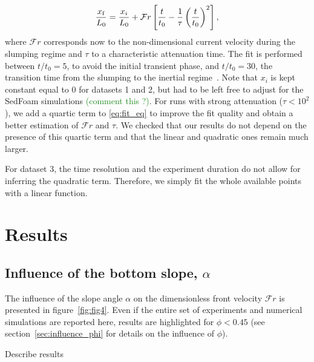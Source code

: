 \documentclass[twocolumn]{article}
\newcommand*{\cyril}{\textcolor{ForestGreen}}
\begin{document}
\begin{equation}
	\label{eq:fit_eq}
	\frac{x_{\rm f}}{L_{0}} = \frac{x_{i}}{L_0} + \mathcal{F}r \left[\frac{t}{t_{0}} - \frac{1}{\tau} \left(\frac{t}{t_{0}}\right)^{2}\right],
\end{equation}
where $\mathcal{F}r$ corresponds now to the non-dimensional current velocity during the slumping regime and $\tau$ to a characteristic attenuation time. The fit is performed between $t/t_{0} = 5$, to avoid the initial transient phase, and $t/t_{0} = 30$, the transition time from the slumping to the inertial regime~\citep{refs}. Note that $x_{i}$ is kept constant equal to 0 for datasets 1 and 2, but had to be left free to adjust for the SedFoam simulations \cyril{(comment this ?)}. For runs with strong attenuation ($\tau < 10^{2}$), we add a quartic term to \eqref{eq:fit_eq} to improve the fit quality and obtain a better estimation of $\mathcal{F}r$ and $\tau$. We checked that our results do not depend on the presence of this quartic term and that the linear and quadratic ones remain much larger.

For dataset 3, the time resolution and the experiment duration do not allow for inferring the quadratic term. Therefore, we simply fit the whole available points with a linear function.

\section{Results}

\subsection{Influence of the bottom slope, $\alpha$}

The influence of the slope angle $\alpha$ on the dimensionless front velocity $\mathcal{F}r$ is presented in figure~\ref{fig:fig4}. Even if the entire set of experiments and numerical simulations are reported here, results are highlighted for $\phi < 0.45$ (see section~\ref{sec:influence_phi} for details on the influence of $\phi$).

Describe results
\end{document}
